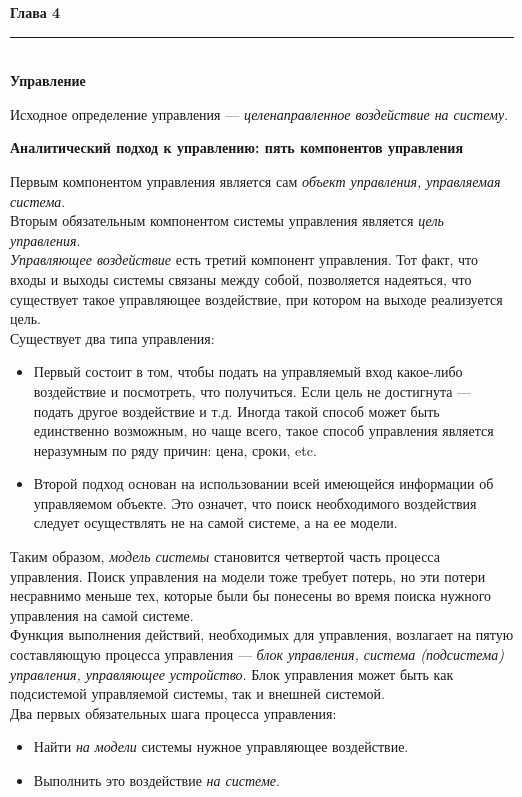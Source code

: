 \documentclass{article}
\newcommand{\note}[1]{\textit{#1}}
\renewcommand{\section}[2]{
	\vspace{6em}
	\begin{flushright}
	\Large
	\baselineskip=0.5\baselineskip
	\textbf{#1}
	\\
	\rule[0.5\baselineskip]{\textwidth}{0.15pt}
	\\
	\textbf{#2}
	\end{flushright}
	}
\renewcommand{\subsection}[1]{
	\vspace{2em}
	\begin{flushright}
		\large
		\textbf{#1}
	\end{flushright}
	}
\begin{document}
\section{Глава 4}{Управление}
Исходное определение управления --- \note{целенаправленное воздействие на систему}.
\subsection{Аналитический подход к управлению: пять компонентов управления}
Первым компонентом управления является сам \note{объект управления, управляемая система}.\\
Вторым обязательным компонентом системы управления является \note{цель управления}.\\
\note{Управляющее воздействие} есть третий компонент управления. Тот факт, что входы и выходы системы связаны между собой, позволяется надеяться, что существует такое управляющее воздействие, при котором на выходе реализуется цель.\\
Существует два типа управления:
\begin{itemize}
	\item Первый состоит в том, чтобы подать на управляемый вход какое-либо воздействие и посмотреть, что получиться. Если цель не достигнута --- подать другое воздействие и т.д. Иногда такой способ может быть единственно возможным, но чаще всего, такое способ управления является неразумным по ряду причин: цена, сроки, etc.
	\item Второй подход основан на использовании всей имеющейся информации об управляемом объекте. Это означет, что поиск необходимого воздействия следует осуществлять не на самой системе, а на ее модели.
\end{itemize}
Таким образом, \note{модель системы} становится четвертой часть процесса управления. Поиск управления на модели тоже требует потерь, но эти потери несравнимо меньше тех, которые были бы понесены во время поиска нужного управления на самой системе.\\
Функция выполнения действий, необходимых для управления, возлагает на пятую составляющую процесса управления --- \note{блок управления, система (подсистема) управления, управляющее устройство}. Блок управления может быть как подсистемой управляемой системы, так и внешней системой.\\
Два первых обязательных шага процесса управления:
\begin{itemize}
	\item Найти \note{на модели} системы нужное управляющее воздействие.
	\item Выполнить это воздействие \note{на системе}.
\end{itemize}
\end{document}
